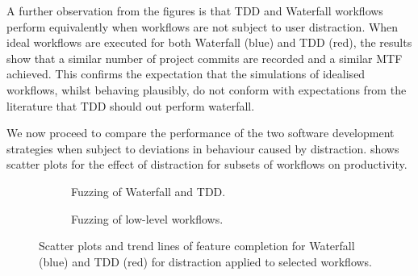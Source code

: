 \documentclass{llncs}
\begin{document}
A further observation from the figures is that TDD and Waterfall workflows perform equivalently when workflows are not
subject to user distraction.  When ideal workflows are executed for both Waterfall (blue) and TDD (red), the results
show that a similar number of project commits are recorded and a similar MTF achieved.  This confirms the expectation
that the simulations of idealised workflows, whilst behaving plausibly, do not conform with expectations from the
literature that TDD should out perform waterfall.

We now proceed to compare the performance of the two software development strategies when subject to deviations in
behaviour caused by distraction.  shows scatter plots for the effect of distraction for
subsets of workflows on productivity.%
\begin{figure}[t]
  \centering
  \hfill
  \begin{subfigure}[t]{2.3in}%
    \caption{Fuzzing of Waterfall and TDD.}
    \label{fig:fuzzing-features:WF}
  \end{subfigure}
  \hfill
  \begin{subfigure}[t]{2.3in}
    \caption{Fuzzing of low-level workflows.}  
  \label{fig:fuzzing-features:CTIDR}
  \end{subfigure}
  \hfill

  \caption{Scatter plots and trend lines of feature completion for Waterfall (blue) and TDD (red) for distraction
    applied to selected workflows.}
  \label{fig:fuzzing-features}
\end{figure}
\end{document}
